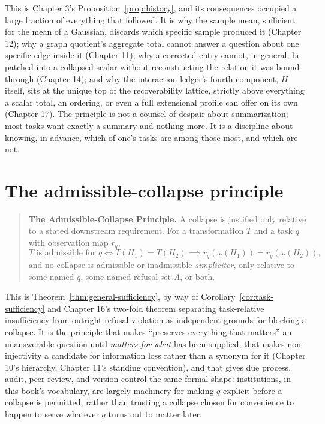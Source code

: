 \documentclass[11pt]{book}
\begin{document}
This is Chapter 3's Proposition~\ref{prop:history}, and its consequences occupied a large fraction of everything that followed. It is why the sample mean, sufficient for the mean of a Gaussian, discards which specific sample produced it (Chapter 12); why a graph quotient's aggregate total cannot answer a question about one specific edge inside it (Chapter 11); why a corrected entry cannot, in general, be patched into a collapsed scalar without reconstructing the relation it was bound through (Chapter 14); and why the interaction ledger's fourth component, $H$ itself, sits at the unique top of the recoverability lattice, strictly above everything a scalar total, an ordering, or even a full extensional profile can offer on its own (Chapter 17). The principle is not a counsel of despair about summarization; most tasks want exactly a summary and nothing more. It is a discipline about knowing, in advance, which of one's tasks are among those most, and which are not.

\section{The admissible-collapse principle}

\begin{quote}
\textbf{The Admissible-Collapse Principle.} A collapse is justified only relative to a stated downstream requirement. For a transformation $T$ and a task $q$ with observation map $r_q$,
\[
T \text{ is admissible for } q \iff T(H_1)=T(H_2) \implies r_q(\omega(H_1))=r_q(\omega(H_2)),
\]
and no collapse is admissible or inadmissible \emph{simpliciter}, only relative to some named $q$, some named refusal set $A$, or both.
\end{quote}

This is Theorem~\ref{thm:general-sufficiency}, by way of Corollary~\ref{cor:task-sufficiency} and Chapter 16's two-fold theorem separating task-relative insufficiency from outright refusal-violation as independent grounds for blocking a collapse. It is the principle that makes ``preserves everything that matters'' an unanswerable question until \emph{matters for what} has been supplied, that makes non-injectivity a candidate for information loss rather than a synonym for it (Chapter 10's hierarchy, Chapter 11's standing convention), and that gives due process, audit, peer review, and version control the same formal shape: institutions, in this book's vocabulary, are largely machinery for making $q$ explicit before a collapse is permitted, rather than trusting a collapse chosen for convenience to happen to serve whatever $q$ turns out to matter later.
\end{document}
